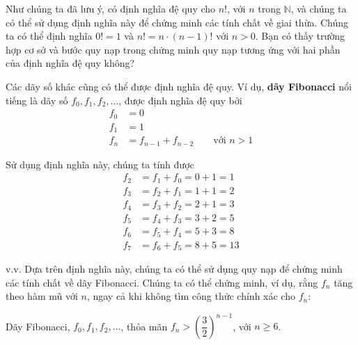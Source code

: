 Như chúng ta đã lưu ý, có định nghĩa đệ quy cho $n!$, với $n$ trong $\mathbb{N}$, và chúng ta có thể sử dụng định nghĩa này để chứng minh các tính chất về giai thừa. Chúng ta có thể định nghĩa $0! = 1$ và $n! = n \cdot (n-1)!$ với $n > 0$. Bạn có thấy trường hợp cơ sở và bước quy nạp trong chứng minh quy nạp tương ứng với hai phần của định nghĩa đệ quy không?

Các dãy số khác cũng có thể được định nghĩa đệ quy. Ví dụ, \textbf{dãy Fibonacci} nổi tiếng là dãy số $f_0, f_1, f_2, \ldots$, được định nghĩa đệ quy bởi
\begin{align*}
f_0 &= 0 \\
f_1 &= 1 \\
f_n &= f_{n-1} + f_{n-2} \qquad \text{với } n > 1
\end{align*}

Sử dụng định nghĩa này, chúng ta tính được
\begin{align*}
f_2 &= f_1 + f_0 = 0 + 1 = 1 \\
f_3 &= f_2 + f_1 = 1 + 1 = 2 \\
f_4 &= f_3 + f_2 = 2 + 1 = 3 \\
f_5 &= f_4 + f_3 = 3 + 2 = 5 \\
f_6 &= f_5 + f_4 = 5 + 3 = 8 \\
f_7 &= f_6 + f_5 = 8 + 5 = 13
\end{align*}

v.v. Dựa trên định nghĩa này, chúng ta có thể sử dụng quy nạp để chứng minh các tính chất về dãy Fibonacci. Chúng ta có thể chứng minh, ví dụ, rằng $f_n$ tăng theo hàm mũ với $n$, ngay cả khi không tìm công thức chính xác cho $f_n$:

\begin{theorem}
Dãy Fibonacci, $f_0, f_1, f_2, \ldots$, thỏa mãn $f_n > \left(\dfrac{3}{2}\right)^{n-1}$, với $n \geq 6$.
\end{theorem}

